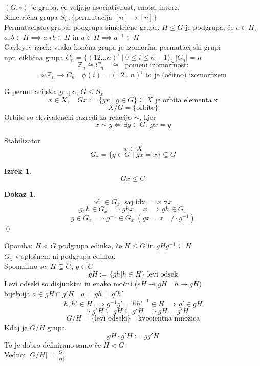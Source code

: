 \documentclass[a4paper,12pt]{article}
\theoremstyle{definition}
\newtheorem{theorem}[counter]{Izrek}
\newtheorem{pro}[counter]{Dokaz}
\theoremstyle{remark}
\newcommand{\Z}{\mathbb{Z}}
\begin{document}
$(G, \circ)$ je grupa, če veljajo asociativnost, enota, inverz. \\
Simetrična grupa $S_n: \{\text{permutacija } [n] \to [n]\}$ \\
Permutacijska grupa: podgrupa simetrične grupe.
$H \leq G$ je podgrupa, če $e \in H$, $a,b \in H \implies a \circ b \in H$ in $a \in H \implies a^{-1} \in H$ \\
Cayleyev izrek: vsaka končna grupa je izomorfna permutacijski grupi \\
npr. ciklična grupa $C_n = \{(1 2 \dots n)^i \; \vert \; 0 \leq i \leq n-1\}$, $|C_n| = n$ \\
\[\Z_n \cong C_n \quad \cong \; \text{ pomeni izomorfnost:}\]
\[\phi: \Z_n \to C_n \quad \phi(i) = (1 2 \dots n)^i \text{ to je (očitno) izomorfizem}\]

G permutacijska grupa, $G \leq S_x$ \\
\[x \in X, \quad Gx := \{gx \; \vert \; g \in G\} \subseteq X \text{ je orbita elementa x}\]
\[X/G = \{\text{orbite}\}\]
Orbite so ekvivalenčni razredi za relacijo $\sim$, kjer \\
\[x \sim y \iff \exists g \in G: \; gx = y\]

Stabilizator \\
\[x \in X\]
\[G_x = \{g \in G \; \vert \; gx = x\} \subseteq G\]

\begin{theorem}
    \[Gx \leq G\]    
\end{theorem}

\begin{pro}
    \[\text{id } \in G_x \text{, saj  idx } = x \; \forall x\]
    \[g,h \in G_x \implies ghx = x \implies gh \in G_x\]
    \[g \in G_x \implies g^{-1} \in G_x \; (gx = x \quad / \cdot g^{-1})\]
    \qed
\end{pro}

Opomba: $H \triangleleft G$ podgrupa edinka, če $H \leq G$ in $gHg^{-1} \subseteq H$ \\
$G_x$ v splošnem ni podgrupa edinka. \\
Spomnimo se: $H \subseteq G$, $g \in G$\\
\[gH := \{gh \vert h \in H\} \text{ levi odsek}\]
Levi odseki so disjunktni in enako močni ($eH \to gH \quad h \to gH$) \\
bijekcija $a \in gH \cap g'H \quad a=gh=g'h'$ \\
\[h,h' \in H \implies g^{-1}g' = hh'^{-1} \in H \implies g' \in gH\]
\[\implies g'H \subseteq gH \subseteq g'H \implies gH = g'H\]
\[G/H = \{\text{levi odseki}\} \quad \text{kvocientna množica}\]
Kdaj je $G/H$ grupa
\[gH \cdot g'H := gg'H\]
To je dobro definirano samo če $H \triangleleft G$ \\
Vedno: $|G/H| = \frac{|G]}{|H|}$ \\
\end{document}
